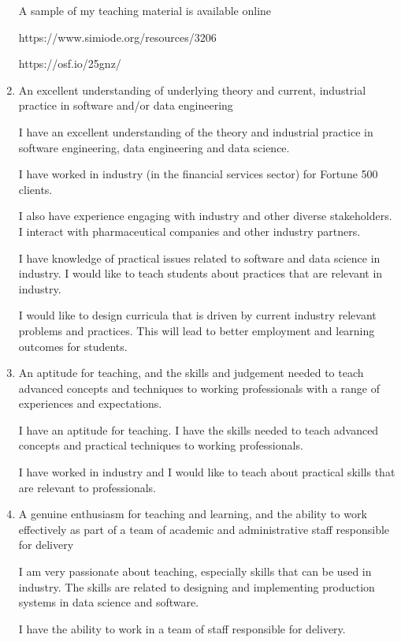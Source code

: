 \documentclass[10pt]{article}
\begin{document}
\begin{enumerate}
A sample of my teaching material is available online

https://www.simiode.org/resources/3206

https://osf.io/25gnz/



\item An excellent understanding of underlying theory and current, industrial practice in
software and/or data engineering

I have an excellent understanding of the theory and industrial practice in software engineering, data engineering and data science.


I have worked in industry (in the financial services sector) for Fortune 500 clients.

I also have experience engaging with industry and other diverse stakeholders. I interact with pharmaceutical companies and other industry partners.

I have knowledge of practical issues related to software and data science in industry.
I would like to teach students about practices that are relevant in industry. 

I would like to design curricula that is driven by current industry relevant problems and practices. This will lead to better employment and learning outcomes for students.


\item An aptitude for teaching, and the skills and judgement needed to teach advanced
concepts and techniques to working professionals with a range of experiences and
expectations.

I have an aptitude for teaching. I have the skills needed to teach advanced concepts and practical techniques to working professionals.

I have worked in industry and I would like to teach about practical skills that are relevant to professionals.




\item A genuine enthusiasm for teaching and learning, and the ability to work effectively as
part of a team of academic and administrative staff responsible for delivery

I am very passionate about teaching, especially skills that can be used in industry.
The skills are related to designing and implementing production systems in data science and software.

I have the ability to work in a team of staff responsible for delivery.




\end{enumerate}
\end{document}
